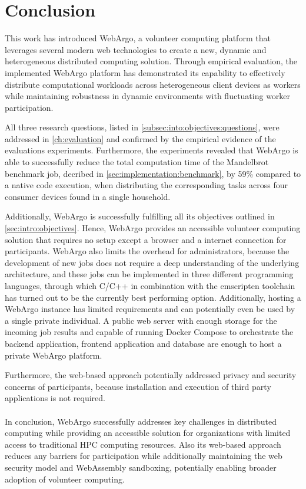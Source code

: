 \chapter{Conclusion}
\label{ch:conclusion}
This work has introduced WebArgo, a volunteer computing platform that leverages several modern web technologies to create a new, dynamic and heterogeneous distributed computing solution. Through empirical evaluation, the implemented WebArgo platform has demonstrated its capability to effectively distribute computational workloads across heterogeneous client devices as workers while maintaining robustness in dynamic environments with fluctuating worker participation. 

All three research questions, listed in \autoref{subsec:into:objectives:questions}, were addressed in \autoref{ch:evaluation} and confirmed by the empirical evidence of the evaluations experiments. Furthermore, the experiments revealed that WebArgo is able to successfully reduce the total computation time of the Mandelbrot benchmark job, decribed in \autoref{sec:implementation:benchmark}, by 59\% compared to a native code execution, when distributing the corresponding tasks across four consumer devices found in a single household.

Additionally, WebArgo is successfully fulfilling all its objectives outlined in \autoref{sec:intro:objectives}. Hence, WebArgo provides an accessible volunteer computing solution that requires no setup except a browser and a internet connection for participants.  WebArgo also limits the overhead for administrators, because the development of new jobs does not require a deep understanding of the underlying architecture, and these jobs can be implemented in three different programming languages, through which C/C++ in combination with the emscripten \cite{methodology:emcc} toolchain has turned out to be the currently best performing option. Additionally, hosting a WebArgo instance has limited requirements and can potentially even be used by a single private individual. A public web server with enough storage for the incoming job results and capable of running Docker Compose \cite{conclusion:docker} to orchestrate the backend application, frontend application and database are enough to host a private WebArgo platform.

Furthermore, the web-based approach potentially addressed privacy and security concerns of participants, because installation and execution of third party applications is not required.
\\~\\
In conclusion, WebArgo successfully addresses key challenges in distributed computing while providing an accessible solution for organizations with limited access to traditional \ac{HPC} computing resources. Also its web-based approach reduces any barriers for participation while additionally maintaining the web security model and WebAssembly sandboxing, potentially enabling broader adoption of volunteer computing.


